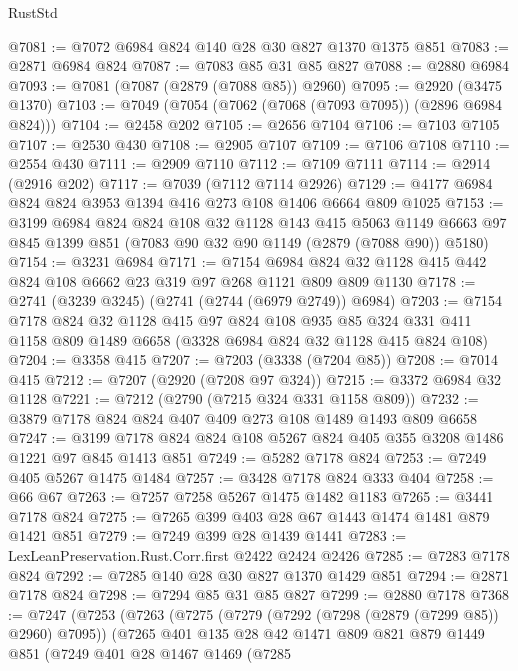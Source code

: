 \begin{lexlean}{RustStd}
\begin{coremodule}
@7081 := @7072 @6984 @824 @140 @28 @30 @827 @1370 @1375 @851
@7083 := @2871 @6984 @824
@7087 := @7083 @85 @31 @85 @827
@7088 := @2880 @6984
@7093 := @7081 (@7087 (@2879 (@7088 @85)) @2960)
@7095 := @2920 (@3475 @1370)
@7103 := @7049 (@7054 (@7062 (@7068 (@7093 @7095)) (@2896 @6984 @824)))
@7104 := @2458 @202
@7105 := @2656 @7104
@7106 := @7103 @7105
@7107 := @2530 @430
@7108 := @2905 @7107
@7109 := @7106 @7108
@7110 := @2554 @430
@7111 := @2909 @7110
@7112 := @7109 @7111
@7114 := @2914 (@2916 @202)
@7117 := @7039 (@7112 @7114 @2926)
@7129 := @4177 @6984 @824 @824 @3953 @1394 @416 @273 @108 @1406 @6664 @809 @1025
@7153 := @3199
    @6984
    @824
    @824
    @108
    @32
    @1128
    @143
    @415
    @5063
    @1149
    @6663
    @97
    @845
    @1399
    @851
    (@7083 @90 @32 @90 @1149 (@2879 (@7088 @90)) @5180)
@7154 := @3231 @6984
@7171 := @7154
    @6984
    @824
    @32
    @1128
    @415
    @442
    @824
    @108
    @6662
    @23
    @319
    @97
    @268
    @1121
    @809
    @809
    @1130
@7178 := @2741 (@3239 @3245) (@2741 (@2744 (@6979 @2749)) @6984)
@7203 := @7154
    @7178
    @824
    @32
    @1128
    @415
    @97
    @824
    @108
    @935
    @85
    @324
    @331
    @411
    @1158
    @809
    @1489
    @6658
    (@3328 @6984 @824 @32 @1128 @415 @824 @108)
@7204 := @3358 @415
@7207 := @7203 (@3338 (@7204 @85))
@7208 := @7014 @415
@7212 := @7207 (@2920 (@7208 @97 @324))
@7215 := @3372 @6984 @32 @1128
@7221 := @7212 (@2790 (@7215 @324 @331 @1158 @809))
@7232 := @3879 @7178 @824 @824 @407 @409 @273 @108 @1489 @1493 @809 @6658
@7247 := @3199 @7178 @824 @824 @108 @5267 @824 @405 @355 @3208 @1486 @1221 @97 @845 @1413 @851
@7249 := @5282 @7178 @824
@7253 := @7249 @405 @5267 @1475 @1484
@7257 := @3428 @7178 @824 @333 @404
@7258 := @66 @67
@7263 := @7257 @7258 @5267 @1475 @1482 @1183
@7265 := @3441 @7178 @824
@7275 := @7265 @399 @403 @28 @67 @1443 @1474 @1481 @879 @1421 @851
@7279 := @7249 @399 @28 @1439 @1441
@7283 := LexLeanPreservation.Rust.Corr.first @2422 @2424 @2426
@7285 := @7283 @7178 @824
@7292 := @7285 @140 @28 @30 @827 @1370 @1429 @851
@7294 := @2871 @7178 @824
@7298 := @7294 @85 @31 @85 @827
@7299 := @2880 @7178
@7368 := @7247
    (@7253
      (@7263
        (@7275
          (@7279 (@7292 (@7298 (@2879 (@7299 @85)) @2960) @7095))
          (@7265
            @401
            @135
            @28
            @42
            @1471
            @809
            @821
            @879
            @1449
            @851
            (@7249
              @401
              @28
              @1467
              @1469
              (@7285

\end{coremodule}
\end{lexlean}
